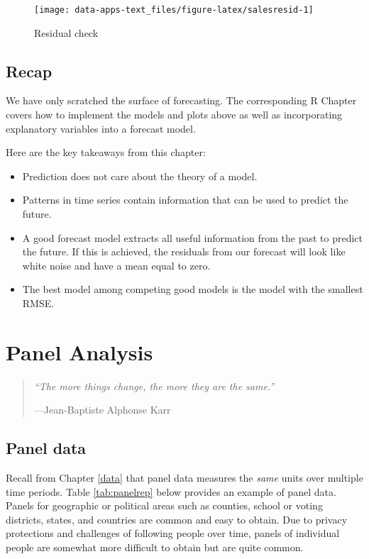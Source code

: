 \documentclass[
]{book}
\providecommand{\tightlist}{%
  \setlength{\itemsep}{0pt}\setlength{\parskip}{0pt}}
\begin{document}
\begin{figure}

{\centering \texttt{[image: data-apps-text\_files/figure-latex/salesresid-1]} 

}

\caption{Residual check}\label{fig:salesresid}
\end{figure}

\hypertarget{recap}{%
\section{Recap}\label{recap}}

We have only scratched the surface of forecasting. The corresponding R Chapter covers how to implement the models and plots above as well as incorporating explanatory variables into a forecast model.

Here are the key takeaways from this chapter:

\begin{itemize}
\tightlist
\item
  Prediction does not care about the theory of a model.
\item
  Patterns in time series contain information that can be used to predict the future.
\item
  A good forecast model extracts all useful information from the past to predict the future. If this is achieved, the residuals from our forecast will look like white noise and have a mean equal to zero.
\item
  The best model among competing good models is the model with the smallest RMSE.
\end{itemize}

\hypertarget{panel-analysis}{%
\chapter{Panel Analysis}\label{panel-analysis}}

\begin{quote}
\emph{``The more things change, the more they are the same.''}

---Jean-Baptiste Alphonse Karr
\end{quote}

\hypertarget{panel-data}{%
\section{Panel data}\label{panel-data}}

Recall from Chapter \ref{data} that panel data measures the \emph{same} units over multiple time periods. Table \ref{tab:panelrep} below provides an example of panel data. Panels for geographic or political areas such as counties, school or voting districts, states, and countries are common and easy to obtain. Due to privacy protections and challenges of following people over time, panels of individual people are somewhat more difficult to obtain but are quite common.
\end{document}
